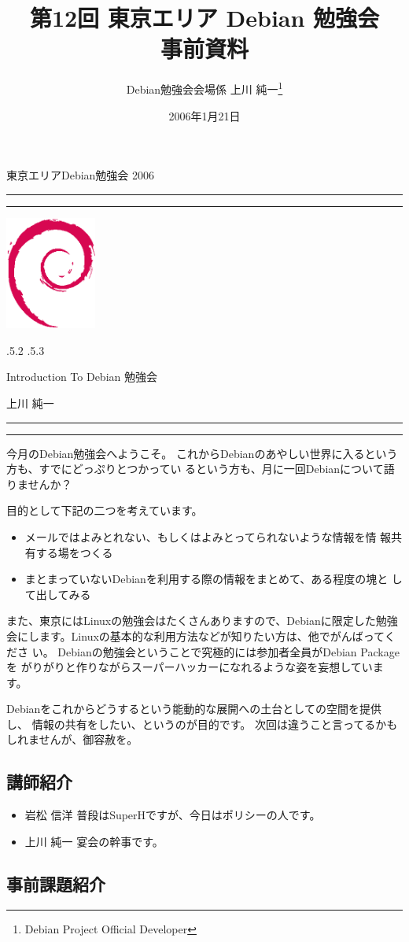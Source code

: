 \documentclass[mingoth,a4paper]{jsarticle}
\makeatletter
\renewcommand{\section}{\@startsection{section}{1}{\z@}%
    {\Cvs \@plus.5\Cdp \@minus.2\Cdp}%
    {.5\Cvs \@plus.3\Cdp}%
    {\normalfont\Large\headfont\raggedright\centering}} %
\newcommand{\dancersection}[2]{%
\newpage
東京エリアDebian勉強会 2006
\hrule
\vspace{0.5mm}
\hrule
\hfill{}\includegraphics[width=3cm]{image200502/openlogo-nd.eps}\\
\vspace{-4cm}
\begin{center}
  \section{#1}
\end{center}
\hfill{}#2\hspace{3cm}\space\\
\hrule
\hrule
\vspace{1cm}
}
\makeatother
\begin{document}
\begin{titlepage}

\title{
 第12回 東京エリア Debian 勉強会\\事前資料}
\date{2006年1月21日}
\author{Debian勉強会会場係 上川 純一\thanks{Debian Project Official Developer}} 
\maketitle
\thispagestyle{empty}
\end{titlepage}

\newpage
\tableofcontents

\dancersection{Introduction To Debian 勉強会}{上川 純一}

今月のDebian勉強会へようこそ。
これからDebianのあやしい世界に入るという方も、すでにどっぷりとつかってい
るという方も、月に一回Debianについて語りませんか？

目的として下記の二つを考えています。

\begin{itemize}
 \item メールではよみとれない、もしくはよみとってられないような情報を情
       報共有する場をつくる
 \item まとまっていないDebianを利用する際の情報をまとめて、ある程度の塊と
       して出してみる
\end{itemize}

また、東京にはLinuxの勉強会はたくさんありますので、Debianに限定した勉強
会にします。Linuxの基本的な利用方法などが知りたい方は、他でがんばってくださ
い。
Debianの勉強会ということで究極的には参加者全員がDebian Packageを
がりがりと作りながらスーパーハッカーになれるような姿を妄想しています。

Debianをこれからどうするという能動的な展開への土台としての空間を提供し、
情報の共有をしたい、というのが目的です。
次回は違うこと言ってるかもしれませんが、御容赦を。

\subsection{講師紹介}

\begin{itemize}
 \item{岩松 信洋} 普段はSuperHですが、今日はポリシーの人です。
 \item{上川 純一} 宴会の幹事です。
\end{itemize}

\subsection{事前課題紹介}
\end{document}

